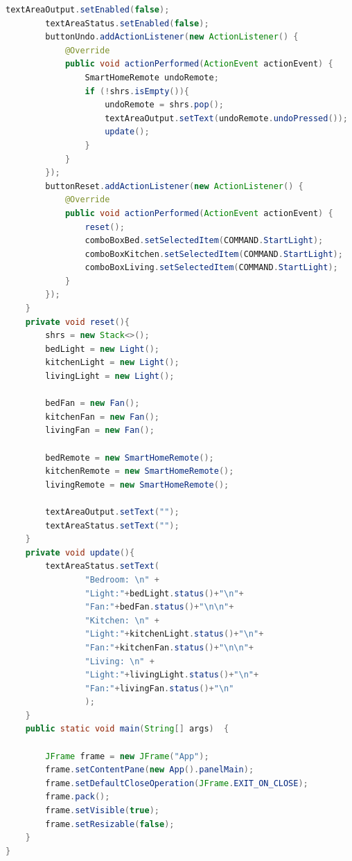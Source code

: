 \documentclass{article}
\begin{document}
\begin{lstlisting}[language=Java]
        textAreaOutput.setEnabled(false);
        textAreaStatus.setEnabled(false);
        buttonUndo.addActionListener(new ActionListener() {
            @Override
            public void actionPerformed(ActionEvent actionEvent) {
                SmartHomeRemote undoRemote;
                if (!shrs.isEmpty()){
                    undoRemote = shrs.pop();
                    textAreaOutput.setText(undoRemote.undoPressed());
                    update();
                }
            }
        });
        buttonReset.addActionListener(new ActionListener() {
            @Override
            public void actionPerformed(ActionEvent actionEvent) {
                reset();
                comboBoxBed.setSelectedItem(COMMAND.StartLight);
                comboBoxKitchen.setSelectedItem(COMMAND.StartLight);
                comboBoxLiving.setSelectedItem(COMMAND.StartLight);
            }
        });
    }
    private void reset(){
        shrs = new Stack<>();
        bedLight = new Light();
        kitchenLight = new Light();
        livingLight = new Light();

        bedFan = new Fan();
        kitchenFan = new Fan();
        livingFan = new Fan();

        bedRemote = new SmartHomeRemote();
        kitchenRemote = new SmartHomeRemote();
        livingRemote = new SmartHomeRemote();

        textAreaOutput.setText("");
        textAreaStatus.setText("");
    }
    private void update(){
        textAreaStatus.setText(
                "Bedroom: \n" +
                "Light:"+bedLight.status()+"\n"+
                "Fan:"+bedFan.status()+"\n\n"+
                "Kitchen: \n" +
                "Light:"+kitchenLight.status()+"\n"+
                "Fan:"+kitchenFan.status()+"\n\n"+
                "Living: \n" +
                "Light:"+livingLight.status()+"\n"+
                "Fan:"+livingFan.status()+"\n"
                );
    }
    public static void main(String[] args)  {

        JFrame frame = new JFrame("App");
        frame.setContentPane(new App().panelMain);
        frame.setDefaultCloseOperation(JFrame.EXIT_ON_CLOSE);
        frame.pack();
        frame.setVisible(true);
        frame.setResizable(false);
    }
}


\end{lstlisting}
\end{document}
